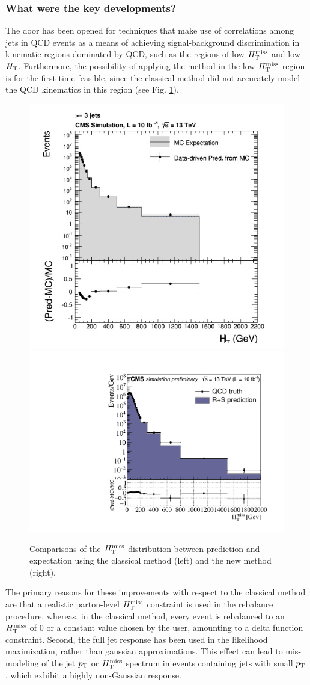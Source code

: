 \subsubsection{What were the key developments?}
The door has been opened for techniques that make use of correlations among jets in QCD events as a means of achieving signal-background discrimination in kinematic regions dominated by QCD, such as the regions of low-$H_{\text{T}}^{\rm miss}$ and low $H_{\rm T}$. Furthermore, the possibility of applying the method in the low-$H_{\text{T}}^{\rm miss}$ region is for the first time feasible, since the classical method did not accurately model the QCD kinematics in this region (see Fig. \ref{fig:OldVsNew}). 
\begin{figure}[h]
\centering
\includegraphics[width=0.49\linewidth]{figures/SusySearches/Ra2b2016/RnSClassicMht.jpg}
\includegraphics[width=0.49\linewidth]{figures/SusySearches/Ra2b2016/LowDeltaPhi_MhtForComparison.pdf}
\caption{Comparisons of the $H_{\text{T}}^{\rm miss}$ distribution between prediction and expectation using the classical method (left) and the new method (right).}
\label{fig:OldVsNew}
\end{figure}
The primary reasons for these improvements with respect to the classical method are that a realistic parton-level $H_{\text{T}}^{\rm miss}$ constraint is used in the rebalance procedure, whereas, in the classical method, every event is rebalanced to an $H_{\text{T}}^{\rm miss}$ of 0 or a constant value chosen by the user, amounting to a delta function constraint. Second, the full jet response has been used in the likelihood maximization, rather than gaussian approximations. This effect can lead to mis-modeling of the jet $p_{\text{T}}$ or $H_{\text{T}}^{\rm miss}$ spectrum in events containing jets with small $p_{\text{T}}$, which exhibit a highly non-Gaussian response. 

